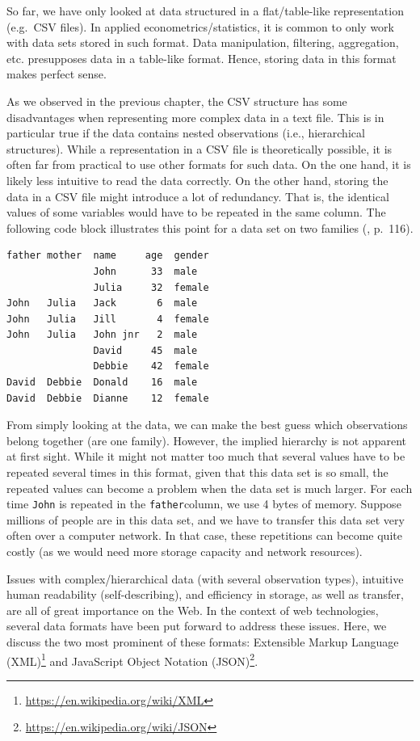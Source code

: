 \documentclass[
  12pt,
]{style/krantz}
\renewcommand{\href}[2]{#2\footnote{\url{#1}}}
\begin{document}
So far, we have only looked at data structured in a flat/table-like representation (e.g.~CSV files). In applied econometrics/statistics, it is common to only work with data sets stored in such format. Data manipulation, filtering, aggregation, etc. presupposes data in a table-like format. Hence, storing data in this format makes perfect sense.

As we observed in the previous chapter, the CSV structure has some disadvantages when representing more complex data in a text file. This is in particular true if the data contains nested observations (i.e., hierarchical structures). While a representation in a CSV file is theoretically possible, it is often far from practical to use other formats for such data. On the one hand, it is likely less intuitive to read the data correctly. On the other hand, storing the data in a CSV file might introduce a lot of redundancy. That is, the identical values of some variables would have to be repeated in the same column. The following code block illustrates this point for a data set on two families (\citep{murrell_2009}, p.~116).

\begin{verbatim}
father mother  name     age  gender
               John      33  male
               Julia     32  female
John   Julia   Jack       6  male
John   Julia   Jill       4  female
John   Julia   John jnr   2  male
               David     45  male
               Debbie    42  female
David  Debbie  Donald    16  male
David  Debbie  Dianne    12  female
\end{verbatim}

From simply looking at the data, we can make the best guess which observations belong together (are one family). However, the implied hierarchy is not apparent at first sight. While it might not matter too much that several values have to be repeated several times in this format, given that this data set is so small, the repeated values can become a problem when the data set is much larger. For each time \texttt{John} is repeated in the \texttt{father}column, we use 4 bytes of memory. Suppose millions of people are in this data set, and we have to transfer this data set very often over a computer network. In that case, these repetitions can become quite costly (as we would need more storage capacity and network resources).

Issues with complex/hierarchical data (with several observation types), intuitive human readability (self-describing), and efficiency in storage, as well as transfer, are all of great importance on the Web. In the context of web technologies, several data formats have been put forward to address these issues. Here, we discuss the two most prominent of these formats: \href{https://en.wikipedia.org/wiki/XML}{Extensible Markup Language (XML)} and \href{https://en.wikipedia.org/wiki/JSON}{JavaScript Object Notation (JSON)}.
\end{document}
